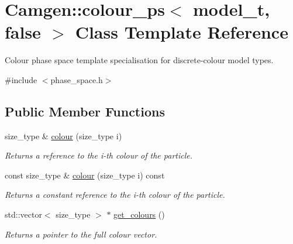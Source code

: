 \hypertarget{a00090}{\section{Camgen\-:\-:colour\-\_\-ps$<$ model\-\_\-t, false $>$ Class Template Reference}
\label{a00090}
}


Colour phase space template specialisation for discrete-\/colour model types.  




{\ttfamily \#include $<$phase\-\_\-space.\-h$>$}

\subsection*{Public Member Functions}
\begin{DoxyCompactItemize}
\item 
\hypertarget{a00090_ab8b71e882067212925dddf7ff6aac01e}{size\-\_\-type \& \hyperlink{a00090_ab8b71e882067212925dddf7ff6aac01e}{colour} (size\-\_\-type i)}\label{a00090_ab8b71e882067212925dddf7ff6aac01e}

\begin{DoxyCompactList}\small\item\em Returns a reference to the i-\/th colour of the particle. \end{DoxyCompactList}\item 
\hypertarget{a00090_a5d5b004b3677689d33be82c3195a0a24}{const size\-\_\-type \& \hyperlink{a00090_a5d5b004b3677689d33be82c3195a0a24}{colour} (size\-\_\-type i) const }\label{a00090_a5d5b004b3677689d33be82c3195a0a24}

\begin{DoxyCompactList}\small\item\em Returns a constant reference to the i-\/th colour of the particle. \end{DoxyCompactList}\item 
\hypertarget{a00090_a42d378206afbd7f3fabd25ee420b0808}{std\-::vector$<$ size\-\_\-type $>$ $\ast$ \hyperlink{a00090_a42d378206afbd7f3fabd25ee420b0808}{get\-\_\-colours} ()}\label{a00090_a42d378206afbd7f3fabd25ee420b0808}

\begin{DoxyCompactList}\small\item\em Returns a pointer to the full colour vector. \end{DoxyCompactList}\end{DoxyCompactItemize}



